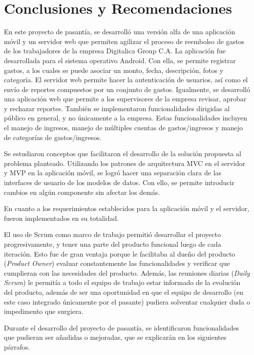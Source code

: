 \chapter{Conclusiones y Recomendaciones} \label{chap:conclusiones}

En este proyecto de pasantía, se desarrolló una versión alfa de una aplicación móvil y un servidor web que permiten agilizar el proceso de reembolso de gastos de los trabajadores de la empresa Digitalica Group C.A. La aplicación fue desarrollada para el sistema operativo Android. Con ella, se permite registrar gastos, a los cuales se puede asociar un monto, fecha, descripción, fotos y categoría. El servidor web permite hacer la autenticación de usuarios, así como el envío de reportes compuestos por un conjunto de gastos. Igualmente, se desarrolló una aplicación web que permite a los supervisores de la empresa revisar, aprobar y rechazar reportes. También se implementaron funcionalidades dirigidas al público en general, y no únicamente a la empresa. Estas funcionalidades incluyen el manejo de ingresos, manejo de múltiples cuentas de gastos/ingresos y manejo de categorías de gastos/ingresos.

Se estudiaron conceptos que facilitaron el desarrollo de la solución propuesta al problema planteado. Utilizando los patrones de arquitectura MVC en el servidor y MVP en la aplicación móvil, se logró hacer una separación clara de las interfaces de usuario de los modelos de datos. Con ello, se permite introducir cambios en algún componente sin afectar los demás.

En cuanto a los requerimientos establecidos para la aplicación móvil y el servidor, fueron implementados en su totalidad.

El uso de Scrum como marco de trabajo permitió desarrollar el proyecto progresivamente, y tener una parte del producto funcional luego de cada iteración. Esto fue de gran ventaja porque le facilitaba al dueño del producto (\textit{Product Owner}) evaluar constantemente las funcionalidades y verificar que cumplieran con las necesidades del producto. Además, las reuniones diarias (\textit{Daily Scrum}) le permitía a todo el equipo de trabajo estar informado de la evolución del producto, además de ser una oportunidad en que el equipo de desarrollo (en este caso integrado únicamente por el pasante) pudiera solventar cualquier duda o impedimento que surgiera.

Durante el desarrollo del proyecto de pasantía, se identificaron funcionalidades que pudieran ser añadidas o mejoradas, que se explicarán en los siguientes párrafos.


